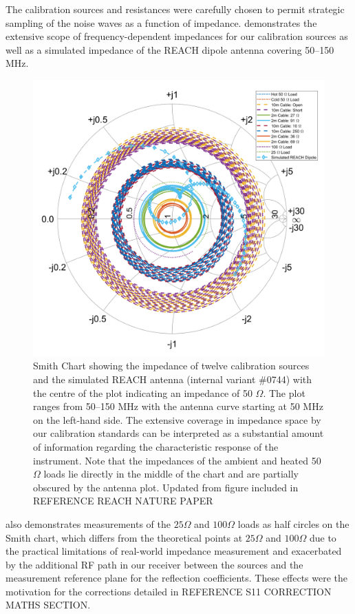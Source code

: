 The calibration sources and resistances were carefully chosen to permit strategic sampling of the noise waves as a function of impedance.  demonstrates the extensive scope of frequency-dependent impedances for our calibration sources as well as a simulated impedance of the REACH dipole antenna covering 50--150 MHz.
\begin{figure}
    \centering
    \includegraphics[scale=0.3]{smith}
    \caption{Smith Chart showing the impedance of twelve calibration sources and the simulated REACH antenna (internal variant \#0744) with the centre of the plot indicating an impedance of 50 $\Omega$. The plot ranges from 50--150 MHz with the antenna curve starting at 50 MHz on the left-hand side. The extensive coverage in impedance space by our calibration standards can be interpreted as a substantial amount of information regarding the characteristic response of the instrument. Note that the impedances of the ambient and heated 50 $\Omega$ loads lie directly in the middle of the chart and are partially obscured by the antenna plot. Updated from figure included in REFERENCE REACH NATURE PAPER}
    \label{fig:smith}
\end{figure}
 also demonstrates measurements of the $25 \Omega$ and $100 \Omega$ loads as half circles on the Smith chart, which differs from the theoretical points at $25 \Omega$ and $100 \Omega$ due to the practical limitations of real-world impedance measurement and exacerbated by the additional RF path in our receiver between the sources and the measurement reference plane for the reflection coefficients. These effects were the motivation for the corrections detailed in REFERENCE S11 CORRECTION MATHS SECTION.

